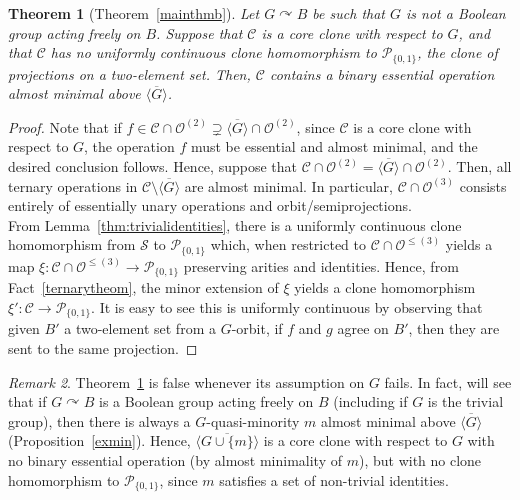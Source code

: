 \documentclass{article}
\newtheorem{theorem}{Theorem}[section]
\theoremstyle{remark}
\newtheorem{remark}[theorem]{Remark}
\theoremstyle{definition}
\def\acts{\curvearrowright}
\begin{document}
\begin{theorem}[Theorem~\ref{mainthmb}]\label{thm:findbin}
 Let $G\acts B$ be such that $G$ is not a Boolean group acting freely on $B$. Suppose that $\mathcal{C}$ is a core clone with respect to $G$, and that $\mathcal{C}$ has no uniformly continuous clone homomorphism to $\mathcal{P}_{\{0,1\}}$, the clone of projections on a two-element set. Then, $\mathcal{C}$ contains a binary essential operation almost minimal above $\overline{\langle G\rangle}$. 
\end{theorem}
\begin{proof} Note that if $f\in \mathcal{C}\cap\mathcal{O}^{(2)}\supsetneq \overline{\langle G\rangle}\cap\mathcal{O}^{(2)}$, since $\mathcal{C}$ is a core clone with respect to $G$, the operation $f$ must be essential and almost minimal, and the desired conclusion follows. Hence, suppose that $\mathcal{C}\cap\mathcal{O}^{(2)}=\overline{\langle G\rangle}\cap\mathcal{O}^{(2)}$. Then, all ternary operations in $\mathcal{C}\setminus \overline{\langle G\rangle}$ are  almost minimal. In particular, $\mathcal{C}\cap\mathcal{O}^{(3)}$ consists entirely of essentially unary operations and orbit\-/semiprojections.\\


From Lemma~\ref{thm:trivialidentities}, there is a uniformly continuous clone homomorphism from $\mathcal{S}$ to $\mathcal{P}_{\{0,1\}}$ which, when restricted to $\mathcal{C}\cap\mathcal{O}^{\leq (3)}$ yields a map $\xi:\mathcal{C}\cap\mathcal{O}^{\leq (3)} \to\mathcal{P}_{\{0,1\}}$ preserving arities and identities. Hence, from Fact~\ref{ternarytheom}, the minor extension of $\xi$ yields a clone homomorphism $\xi':\mathcal{C}\to\mathcal{P}_{\{0,1\}}$. It is easy to see this is uniformly continuous by observing that given $B'$ a two-element set from a $G$-orbit, if $f$ and $g$ agree on $B'$, then they are sent to the same projection.  
\end{proof}

\begin{remark} Theorem~\ref{thm:findbin} is false whenever its assumption on $G$ fails. %
 In fact, will see that if $G\acts B$ is a Boolean group acting freely on $B$ (including if $G$ is the trivial group), then there is always a $G$-quasi-minority $m$ almost minimal above $\overline{\langle G\rangle}$ (Proposition~\ref{exmin}). Hence, $\overline{\langle G\cup\{m\}\rangle}$ is a core clone with respect to $G$ with no binary essential operation (by almost minimality of $m$), but with no clone homomorphism to $\mathcal{P}_{\{0,1\}}$, since $m$ satisfies a set of non-trivial identities. 
\end{remark}
\end{document}
